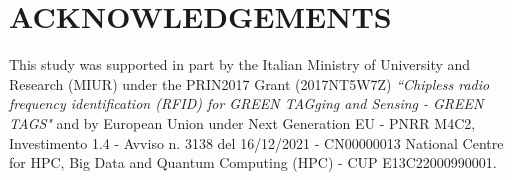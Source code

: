 \documentclass[a4paper, twosided]{book}
\begin{document}
\section[Acknowledgements]{\changefont ACKNOWLEDGEMENTS}\label{Sec4.4}
\noindent
This study was supported in part by the Italian Ministry of University and Research (MIUR) under the PRIN2017 Grant (2017NT5W7Z) \textsl{“Chipless radio frequency identification (RFID) for GREEN TAGging and Sensing - GREEN TAGS"} and by European Union under Next Generation EU - PNRR M4C2, Investimento 1.4 - Avviso n. 3138 del 16/12/2021 - CN00000013 National Centre for HPC, Big Data and Quantum Computing (HPC) - CUP E13C22000990001.

\printbibliography
\end{document}
